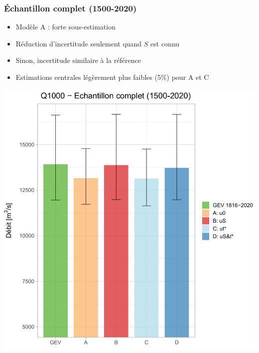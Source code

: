 \documentclass[compress,9pt]{beamer}
\begin{document}
	
	\begin{frame}[c]
		\frametitle{Échantillon complet (1500-2020)}
		\begin{minipage}{0.39\textwidth}
			\centering
			\begin{itemize}
				\item<1-> [$\vartriangleright$] Modèle A : forte sous-estimation
				\vfill
				\item<2-> [$\vartriangleright$] Réduction d'incertitude seulement quand $S$ est connu 
				\vfill
				\item<3-> [$\vartriangleright$] Sinon, incertitude similaire à la référence
				\vfill
				\item<4-> [$\vartriangleright$] Estimations centrales légèrement plus faibles (5\%) pour A et C
			\end{itemize}
		\end{minipage}
		\begin{minipage}{0.6\textwidth}
			\begin{center}
				\includegraphics[width = .9\textwidth]{./Figures/BarplotC4Full.pdf} 
			\end{center}
		\end{minipage}
	\end{frame}
	
\end{document}
